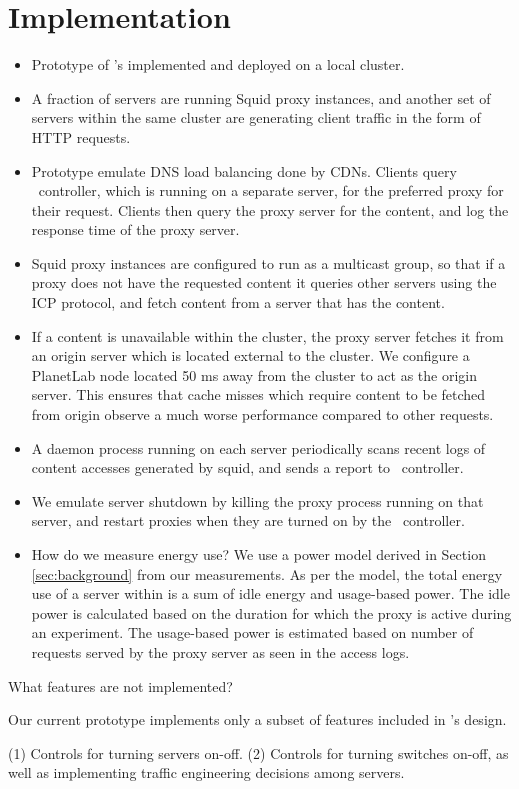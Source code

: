 
\section{Implementation}

\begin{itemize}
\item
Prototype of \shrink's implemented and deployed on a local cluster.
\item
A fraction of servers are running Squid proxy instances, and another set of servers within the same cluster are generating client traffic in the form of HTTP requests.
\item
Prototype emulate DNS load balancing done by CDNs. Clients query \shrink\ controller, which is running on a separate server, for the preferred proxy for their request. Clients then query the proxy server for the content, and log the response time of the proxy server.
\item
Squid proxy instances are configured to run as a multicast group, so that if a proxy does not have the requested content it queries other servers using the ICP protocol, and fetch content from a server that has the content.
\item
If a content is unavailable within the cluster, the proxy server fetches it from an origin server which is located external to the cluster. We configure a PlanetLab node located 50 ms away from the cluster to act as the origin server. This ensures that cache misses which require content to be fetched from origin observe a much worse performance compared to other requests.
\item
A daemon process running on each server periodically scans recent logs of content accesses generated by squid, and sends a report to \shrink\ controller. 
\item
We emulate server shutdown by killing the proxy process running on that server, and restart proxies when they are turned on by the \shrink\ controller.
\item
How do we measure energy use?  We use a power model derived in Section \ref{sec:background} from our measurements. As per the model, the total energy use of a server within  is a sum of idle energy and usage-based power. The idle power is calculated based on the duration for which the proxy is active during an experiment. The usage-based power is estimated based on number of requests served by the proxy server as seen in the access logs.
\end{itemize}

What features are not implemented?

Our current prototype implements only a subset of features included in \shrink's design.

(1) Controls for turning servers on-off.
(2) Controls for turning switches on-off, as well as implementing traffic engineering decisions among servers.

